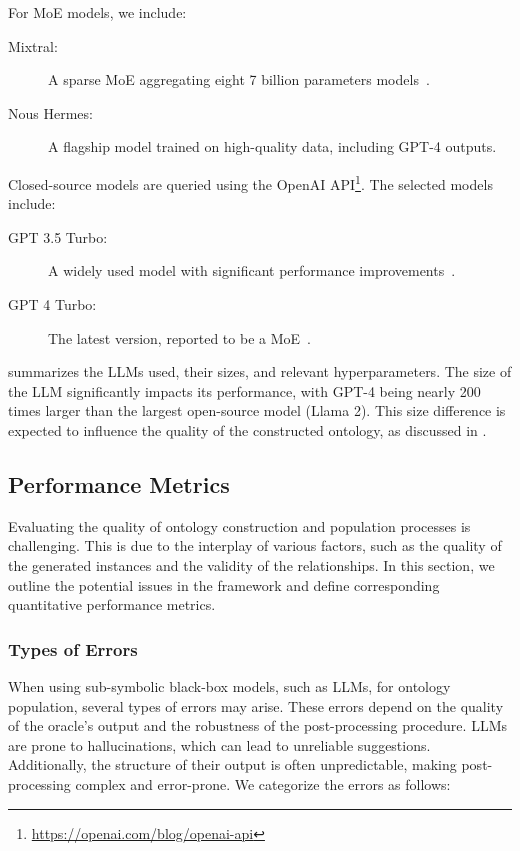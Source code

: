 %
For \gls{MoE} models, we include:
%
\begin{description}
    \item[Mixtral:] A sparse \gls{MoE} aggregating eight 7 billion parameters models~\cite{mixtral}.
    \item[Nous Hermes:] A flagship model trained on high-quality data, including GPT-4 outputs.
\end{description}

%
Closed-source models are queried using the OpenAI API\footnote{\url{https://openai.com/blog/openai-api}}.
%
The selected models include:
%
\begin{description}
    \item[GPT 3.5 Turbo:] A widely used model with significant performance improvements~\cite{gpt3-2020}.
    \item[GPT 4 Turbo:] The latest version, reported to be a \gls{MoE}~\cite{gpt4}.
\end{description}

%
 summarizes the \glspl{LLM} used, their sizes, and relevant hyperparameters.
%
The size of the \gls{LLM} significantly impacts its performance, with GPT-4 being nearly 200 times larger than the largest open-source model (Llama 2).
%
This size difference is expected to influence the quality of the constructed ontology, as discussed in .




\subsection{Performance Metrics}
\label{subsec:performance-metrics}
%
Evaluating the quality of ontology construction and population processes is challenging.
%
This is due to the interplay of various factors, such as the quality of the generated instances and the validity of the relationships.
%
In this section, we outline the potential issues in the \llmfkg{} framework and define corresponding quantitative performance metrics.


\subsubsection{Types of Errors}
\label{subsubsec:error_types}
%
When using sub-symbolic black-box models, such as \glspl{LLM}, for ontology population, several types of errors may arise.
%
These errors depend on the quality of the oracle's output and the robustness of the post-processing procedure.
%
\glspl{LLM} are prone to hallucinations, which can lead to unreliable suggestions.
%
Additionally, the structure of their output is often unpredictable, making post-processing complex and error-prone.
%
We categorize the errors as follows:

